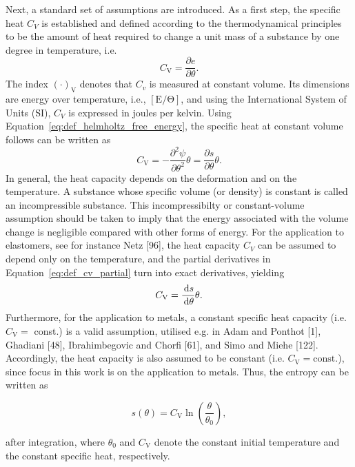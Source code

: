 Next, a standard set of assumptions are introduced.
As a first step, the specific heat \(C_{V}\) is established and defined according to the thermodynamical principles to be the amount of heat required to change a unit mass of a substance by one degree in temperature, i.e.
\begin{equation}
C_{\mathrm{V}}=\frac{\partial e}{\partial \theta}.
\end{equation}
The index \((\cdot)_\mathrm{V}\) denotes that \(C_{v}\) is measured at constant volume.
Its dimensions are energy over temperature, i.e., \(\mathrm{[E/\Theta]}\), and using the International System of Units (SI), \(C_{V}\) is expressed in joules per kelvin.
Using Equation~\ref{eq:def_helmholtz_free_energy}, the specific heat at constant volume follows can be written as
\begin{equation} \label{eq:def_cv_partial}
C_{\mathrm{V}}=-\frac{\partial^{2} \psi}{\partial \theta^{2}} \theta=\frac{\partial s}{\partial \theta} \theta.
\end{equation}
In general, the heat capacity depends on the deformation and on the temperature.
A substance whose specific volume (or density) is constant is called an incompressible substance.
This incompressibilty or constant-volume assumption should be taken to imply that the energy associated with the volume change is negligible compared with other forms of energy.
For the application to elastomers, see for instance Netz [96], the heat capacity \(C_{V}\) can be assumed to depend only on the temperature, and the partial derivatives in Equation~\eqref{eq:def_cv_partial} turn into exact derivatives, yielding
\begin{equation}
  C_\mathrm{V} = \frac{\,\mathrm{d} s}{\,\mathrm{d} \theta}\theta.
\end{equation}
Furthermore, for the application to metals, a constant specific heat capacity (i.e. \(C_{\mathrm{V}}=\) const.) is a valid assumption, utilised e.g. in Adam and Ponthot [1], Ghadiani [48], Ibrahimbegovic and Chorfi [61], and Simo and Miehe [122].
Accordingly, the heat capacity is also assumed to be constant (i.e. \(C_{\mathrm{V}}= \mathrm{const}\).), since focus in this work is on the application to metals.
Thus, the entropy can be written as
\begin{highlight}
\begin{equation}
s(\theta) = C_\mathrm{V}\ln\left(\frac{\theta}{\theta_0}\right),
\end{equation}
\end{highlight}
after integration, where \(\theta_{0}\) and \(C_{\mathrm{V}}\) denote the constant initial temperature and the constant specific heat, respectively.

